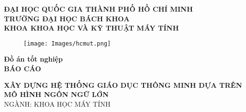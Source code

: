 \documentclass[12pt,a4paper]{report}
\theoremstyle{definition}
\begin{document}
\begin{titlepage}

\begin{singlespace}
\vspace{-2cm}
\begin{center}
\fontsize{15}{12} \textbf{ĐẠI HỌC QUỐC GIA THÀNH PHỐ HỒ CHÍ MINH} \\
\vspace{0.2cm}
\fontsize{15}{12} \textbf{TRƯỜNG ĐẠI HỌC BÁCH KHOA} \\
\vspace{0.2cm}
\fontsize{15}{12} \textbf{KHOA KHOA HỌC VÀ KỸ THUẬT MÁY TÍNH}
\end{center}
\end{singlespace}

\vspace{0.2cm}

\begin{figure}[h!]
\begin{center}
\texttt{[image: Images/hcmut.png]}
\end{center}
\end{figure}

\vspace{0.3cm}

\begin{center}
\fontsize{15}{12} \textbf{Đồ án tốt nghiệp}  \\ 
\fontsize{15}{12} \textbf{BÁO CÁO}  \\ 
\end{center}

\vspace{0.5cm}

\begin{center}
    \fontsize{20}{12} \textbf{XÂY DỰNG HỆ THỐNG GIÁO DỤC THÔNG MINH DỰA TRÊN MÔ HÌNH NGÔN NGỮ LỚN} \\
    \vspace{0.5em}
    \fontsize{15}{12}\selectfont NGÀNH: KHOA HỌC MÁY TÍNH \\
\end{center}


\end{titlepage}
\end{document}

